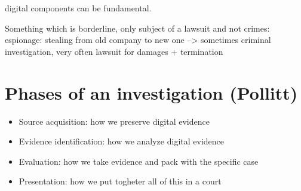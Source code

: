         digital components can be fundamental.

    Something which is borderline, only subject of a lawsuit and not crimes:
        espionage: stealing from old company to new one --> sometimes criminal investigation, very often lawsuit for damages + termination 

\section{Phases of an investigation (Pollitt)}
    \begin{itemize}
        \item Source acquisition: how we preserve digital evidence
        \item Evidence identification: how we analyze digital evidence 
        \item Evaluation: how we take evidence and pack with the specific case
        \item Presentation: how we put togheter all of this in a court
    \end{itemize}
